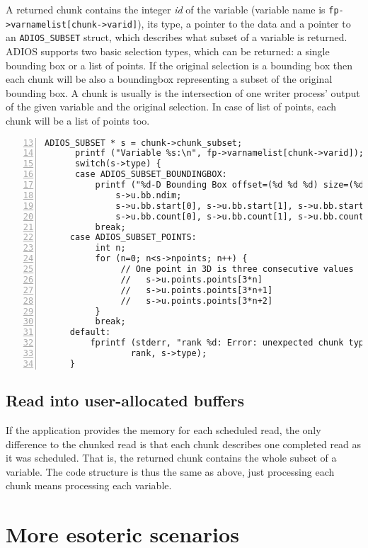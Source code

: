 A returned chunk contains the integer \emph{id} of the variable (variable name is \verb+fp->varnamelist[chunk->varid]+), its type, a pointer to the data and a pointer to an \verb+ADIOS_SUBSET+ struct, which describes what subset of a variable is returned. ADIOS supports two basic selection types, which can be returned: a single bounding box or a list of points. If the original selection is a bounding box then each chunk will be also a boundingbox representing a subset of the original bounding box. A chunk is usually is the intersection of one writer process' output of the given variable and the original selection. In case of list of points, each chunk will be a list of points too. 

\begin{lstlisting}[numbers=left, numberstyle=\color{gray}, stepnumber=2,firstnumber=13,
                             caption={Processing chunks from a file}, label=code:process_chunk]
      ADIOS_SUBSET * s = chunk->chunk_subset;
      printf ("Variable %s:\n", fp->varnamelist[chunk->varid]);
      switch(s->type) {
      case ADIOS_SUBSET_BOUNDINGBOX:
          printf ("%d-D Bounding Box offset=(%d %d %d) size=(%d %d %d)\n",
              s->u.bb.ndim;
              s->u.bb.start[0], s->u.bb.start[1], s->u.bb.start[2],
              s->u.bb.count[0], s->u.bb.count[1], s->u.bb.count[2]);
          break;
     case ADIOS_SUBSET_POINTS:
          int n;
          for (n=0; n<s->npoints; n++) {
               // One point in 3D is three consecutive values
               //   s->u.points.points[3*n]
               //   s->u.points.points[3*n+1]
               //   s->u.points.points[3*n+2]
          }
          break;
     default:
         fprintf (stderr, "rank %d: Error: unexpected chunk type: %d\n",
                 rank, s->type);
     }  
 \end{lstlisting}



\subsection{Read into user-allocated buffers}
If the application provides the memory for each scheduled read, the only difference 
to the chunked read is that each chunk describes one completed read as it was scheduled.
That is, the returned chunk contains the whole subset of a variable. The code structure 
is thus the same as above, just processing each chunk means processing each variable.


\section {More esoteric scenarios}


